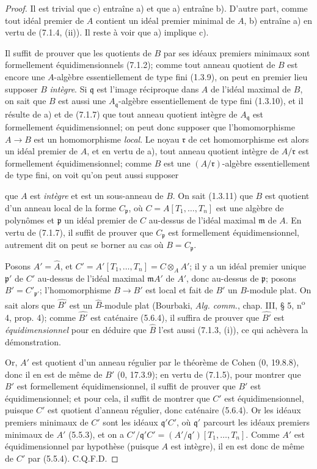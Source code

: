 \begin{proof}
Il est trivial que c) entraîne a) et que a) entraîne b). D'autre part,
comme tout idéal premier de $A$ contient un idéal premier minimal de $A$,
b) entraîne a) en vertu de (7.1.4, (ii)). Il reste à voir que a) implique
c).

Il suffit de prouver que les quotients de $B$ par ses idéaux premiers
minimaux sont formellement équidimensionnels (7.1.2); comme tout anneau
quotient de $B$ est encore une $A$-algèbre essentiellement de type fini
(1.3.9), on peut en premier lieu supposer $B$ \emph{intègre}. Si
$\mathfrak q$ est
l'image réciproque dans $A$ de l'idéal maximal de $B$, on sait que $B$ est
aussi une $A_{\mathfrak q}$-algèbre essentiellement de type fini (1.3.10),
et il résulte de a) et de (7.1.7) que tout anneau quotient intègre de
$A_{\mathfrak q}$ est formellement équidimensionnel; on peut donc supposer
que l'homomorphisme $A\to B$ est un homomorphisme \emph{local}. Le noyau
$\mathfrak r$ de cet homomorphisme est alors un idéal premier de $A$, et en
vertu de a), tout anneau quotient intègre de $A/\mathfrak r$ est
formellement équidimensionnel; comme $B$ est une
$(A/\mathfrak r)$-algèbre essentiellement de type fini, on voit qu'on peut
aussi supposer

que $A$ est \emph{intègre} et est un sous-anneau de $B$. On sait (1.3.11)
que $B$
est quotient d'un anneau local de la forme $C_{\mathfrak p}$, où
$C=A[T_1,\ldots,T_n]$ est une algèbre de polynômes et $\mathfrak p$ un
idéal premier de $C$ au-dessus de l'idéal maximal $\mathfrak m$ de $A$. En
vertu de (7.1.7), il suffit de prouver que $C_{\mathfrak p}$ est
formellement équidimensionnel, autrement dit on peut se borner au cas où
$B=C_{\mathfrak p}$.

Posons $A'=\widehat A$, et
$C'=A'[T_1,\ldots,T_n]=C\otimes_AA'$; il y a un idéal premier unique
$\mathfrak p'$ de $C'$ au-dessus de l'idéal maximal $\mathfrak mA'$ de
$A'$, donc au-dessus de $\mathfrak p$; posons $B'=C'_{\mathfrak p'}$;
l'homomorphisme $B\to B'$ est local et fait de $B'$ un $B$-module plat. On
sait alors que $\widehat {B'}$ est un $\widehat B$-module plat (Bourbaki,
\emph{Alg. comm.}, chap. III, § 5, n\textsuperscript{o} 4, prop. 4); comme
$\widehat {B'}$ est caténaire (5.6.4), il suffira de prouver que
$\widehat {B'}$ est \emph{équidimensionnel} pour en déduire que $\widehat B$ l'est
aussi (7.1.3, (i)), ce qui achèvera la démonstration.

Or, $A'$ est quotient d'un anneau régulier par le théorème de Cohen (0,
19.8.8), donc il en est de même de $B'$ (0, 17.3.9); en vertu de (7.1.5),
pour montrer que $B'$ est formellement équidimensionnel, il suffit de
prouver que $B'$ est équidimensionnel; et pour cela, il suffit de montrer
que $C'$ est équidimensionnel, puisque $C'$ est quotient d'anneau régulier,
donc caténaire (5.6.4). Or les idéaux premiers minimaux de $C'$ sont les
idéaux $\mathfrak q'C'$, où $\mathfrak q'$ parcourt les idéaux premiers
minimaux de $A'$ (5.5.3), et on a
$C'/\mathfrak q'C'=(A'/\mathfrak q')[T_1,\ldots,T_n]$. Comme $A'$ est
équidimensionnel par hypothèse (puisque $A$ est intègre), il en est donc de
même de $C'$ par (5.5.4). C.Q.F.D.
\end{proof}

